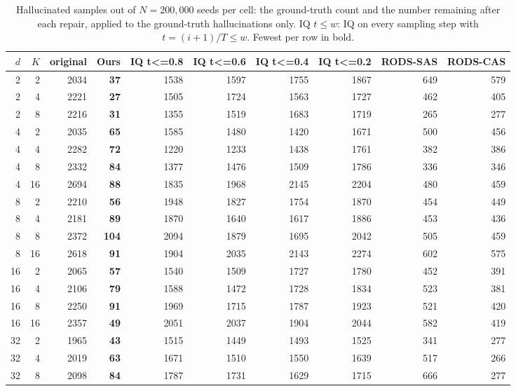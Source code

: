 \begin{table}[t]
\centering
\caption{Hallucinated samples out of $N=200,000$ seeds per cell: the ground-truth count and the number remaining after each repair, applied to the ground-truth hallucinations only. IQ $t\le w$: IQ on every sampling step with $t=(i+1)/T \le w$. Fewest per row in bold.}
\label{tab:hall-bench}
\begin{tabular}{rr r rrrrrrr}
\toprule
$d$ & $K$ & original & Ours & IQ t<=0.8 & IQ t<=0.6 & IQ t<=0.4 & IQ t<=0.2 & RODS-SAS & RODS-CAS \\
\midrule
2 & 2 & 2034 & \textbf{37} & 1538 & 1597 & 1755 & 1867 & 649 & 579 \\
2 & 4 & 2221 & \textbf{27} & 1505 & 1724 & 1563 & 1727 & 462 & 405 \\
2 & 8 & 2216 & \textbf{31} & 1355 & 1519 & 1683 & 1719 & 265 & 277 \\
\midrule
4 & 2 & 2035 & \textbf{65} & 1585 & 1480 & 1420 & 1671 & 500 & 456 \\
4 & 4 & 2282 & \textbf{72} & 1220 & 1233 & 1438 & 1761 & 382 & 386 \\
4 & 8 & 2332 & \textbf{84} & 1377 & 1476 & 1509 & 1786 & 336 & 346 \\
4 & 16 & 2694 & \textbf{88} & 1835 & 1968 & 2145 & 2204 & 480 & 459 \\
\midrule
8 & 2 & 2210 & \textbf{56} & 1948 & 1827 & 1754 & 1870 & 454 & 449 \\
8 & 4 & 2181 & \textbf{89} & 1870 & 1640 & 1617 & 1886 & 453 & 436 \\
8 & 8 & 2372 & \textbf{104} & 2094 & 1879 & 1695 & 2042 & 505 & 459 \\
8 & 16 & 2618 & \textbf{91} & 1904 & 2035 & 2143 & 2274 & 602 & 575 \\
\midrule
16 & 2 & 2065 & \textbf{57} & 1540 & 1509 & 1727 & 1780 & 452 & 391 \\
16 & 4 & 2106 & \textbf{79} & 1588 & 1472 & 1728 & 1834 & 523 & 381 \\
16 & 8 & 2250 & \textbf{91} & 1969 & 1715 & 1787 & 1923 & 521 & 420 \\
16 & 16 & 2357 & \textbf{49} & 2051 & 2037 & 1904 & 2044 & 582 & 419 \\
\midrule
32 & 2 & 1965 & \textbf{43} & 1515 & 1449 & 1493 & 1525 & 341 & 277 \\
32 & 4 & 2019 & \textbf{63} & 1671 & 1510 & 1550 & 1639 & 517 & 266 \\
32 & 8 & 2098 & \textbf{84} & 1787 & 1731 & 1629 & 1715 & 666 & 277 \\

\end{tabular}
\end{table}
